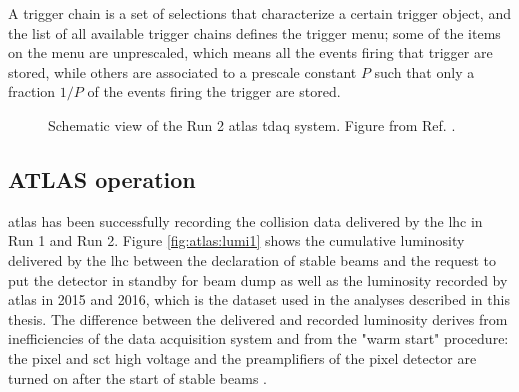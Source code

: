 A trigger chain is a set of selections that characterize a certain trigger object, and the list of all available trigger chains defines the trigger menu; some of the items on the menu are unprescaled, which means all the events firing that trigger are stored, while others are associated to a prescale constant $P$ such that only a fraction $1/P$ of the events firing the trigger are stored.

\begin{figure}[ht]
\centering
{}
\caption{Schematic view of the Run 2 \gls{atlas} \gls{tdaq} system. Figure from Ref. \cite{Aaboud:2016leb}.}
\label{fig:atlas:trig}
\end{figure}


\subsection{ATLAS operation}

\gls{atlas} has been successfully recording the collision data delivered by the \gls{lhc} in Run 1 and Run 2. Figure \ref{fig:atlas:lumi1} shows the cumulative luminosity delivered by the \gls{lhc} between the declaration of stable beams and the request to put the detector in standby for beam dump  as well as the luminosity recorded by \gls{atlas} in 2015 and 2016, which is the dataset used in the analyses described in this thesis. The difference between the delivered and recorded luminosity derives from inefficiencies of the data acquisition system and from the "warm start" procedure: 
the pixel and \gls{sct} high voltage and the preamplifiers of the pixel detector are turned on after the start of stable beams \cite{LumiTwiki}.

